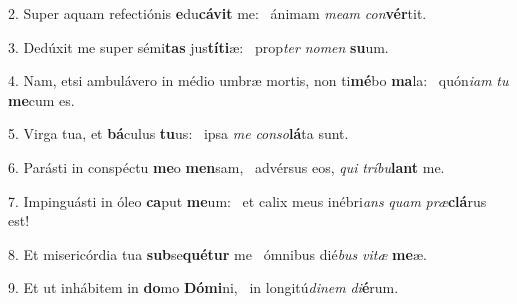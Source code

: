 2. Super aquam refectiónis \textbf{e}du\textbf{cá}\textbf{vit} me: \ast\  ánimam \textit{me}\textit{am} \textit{con}\textbf{vér}tit.\

3. Dedúxit me super sémi\textbf{tas} jus\textbf{tí}\textbf{ti}æ: \ast\  prop\textit{ter} \textit{no}\textit{men} \textbf{su}um.\

4. Nam, etsi ambulávero in médio umbræ mortis, non ti\textbf{mé}bo \textbf{ma}la: \ast\  quón\textit{i}\textit{am} \textit{tu} \textbf{me}cum es.\

5. Virga tua, et \textbf{bá}culus \textbf{tu}us: \ast\  ipsa \textit{me} \textit{con}\textit{so}\textbf{lá}ta sunt.\

6. Parásti in conspéctu \textbf{me}o \textbf{men}sam, \ast\  advérsus eos, \textit{qui} \textit{trí}\textit{bu}\textbf{lant} me.\

7. Impinguásti in óleo \textbf{ca}put \textbf{me}um: \ast\  et calix meus inébri\textit{ans} \textit{quam} \textit{præ}\textbf{clá}rus est!\

8. Et misericórdia tua \textbf{sub}se\textbf{qué}\textbf{tur} me \ast\  ómnibus dié\textit{bus} \textit{vi}\textit{tæ} \textbf{me}æ.\

9. Et ut inhábitem in \textbf{do}mo \textbf{Dó}\textbf{mi}ni, \ast\  in longitú\textit{di}\textit{nem} \textit{di}\textbf{é}rum.\

